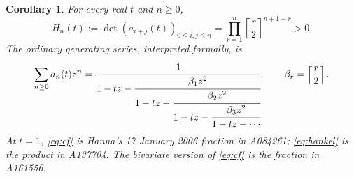 \documentclass[11pt]{article}
\newtheorem{corollary}[theorem]{Corollary}
\begin{document}
\begin{corollary}\label{cor:hankel}
For every real $t$ and $n\geq0$,
\begin{equation}\label{eq:hankel}
 H_n(t):=\det(a_{i+j}(t))_{0\leq i,j\leq n}
 =\prod_{r=1}^n\left\lceil\frac r2\right\rceil^{n+1-r}>0.
\end{equation}
The ordinary generating series, interpreted formally, is
\begin{equation}\label{eq:cf}
 \sum_{n\geq0}a_n(t)z^n
 =\cfrac{1}{1-tz-\cfrac{\beta_1z^2}{1-tz-
       \cfrac{\beta_2z^2}{1-tz-\cfrac{\beta_3z^2}{1-tz-\cdots}}}},
 \qquad \beta_r=\left\lceil\frac r2\right\rceil.
\end{equation}
At $t=1$, \eqref{eq:cf} is Hanna's 17 January 2006 fraction in A084261;
\eqref{eq:hankel} is the product in A137704. The bivariate version
of \eqref{eq:cf} is the fraction in A161556.
\end{corollary}
\end{document}
